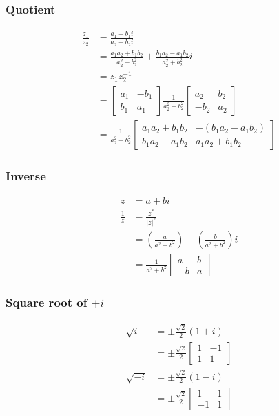 \subsubsection*{Quotient}

$$
\begin{aligned}
\frac{z_{1}}{z_{2}} & =\frac{a_{1}+b_{1} i}{a_{2}+b_{2} i} \\
& =\frac{a_{1} a_{2}+b_{1} b_{2}}{a_{2}^{2}+b_{2}^{2}}+\frac{b_{1} a_{2}-a_{1} b_{2}}{a_{2}^{2}+b_{2}^{2}} i \\
& =z_{1} z_{2}^{-1} \\
& =\left[\begin{array}{cc}
a_{1} & -b_{1} \\
b_{1} & a_{1}
\end{array}\right] \frac{1}{a_{2}^{2}+b_{2}^{2}}\left[\begin{array}{cc}
a_{2} & b_{2} \\
-b_{2} & a_{2}
\end{array}\right] \\
& =\frac{1}{a_{2}^{2}+b_{2}^{2}}\left[\begin{array}{cc}
a_{1} a_{2}+b_{1} b_{2} & -\left(b_{1} a_{2}-a_{1} b_{2}\right) \\
b_{1} a_{2}-a_{1} b_{2} & a_{1} a_{2}+b_{1} b_{2}
\end{array}\right]
\end{aligned}
$$

\subsubsection*{Inverse}
$$
\begin{aligned}
z & =a+b i \\
\frac{1}{z} & =\frac{z^{*}}{|z|^{2}} \\
& =\left(\frac{a}{a^{2}+b^{2}}\right)-\left(\frac{b}{a^{2}+b^{2}}\right) i \\
& =\frac{1}{a^{2}+b^{2}}\left[\begin{array}{cc}
a & b \\
-b & a
\end{array}\right]
\end{aligned}
$$

\subsubsection*{Square root of $\pm i$}
$$
\begin{aligned}
\sqrt{i} & =\pm \frac{\sqrt{2}}{2}(1+i) \\
& =\pm \frac{\sqrt{2}}{2}\left[\begin{array}{cc}
1 & -1 \\
1 & 1
\end{array}\right] \\
\sqrt{-i} & =\pm \frac{\sqrt{2}}{2}(1-i) \\
& =\pm \frac{\sqrt{2}}{2}\left[\begin{array}{cc}
1 & 1 \\
-1 & 1
\end{array}\right]
\end{aligned}
$$

